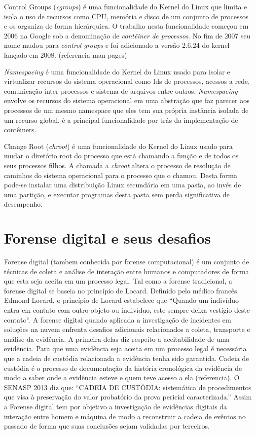 Control Groups (\textit{cgroups}) é uma funcionalidade do Kernel do Linux que limita e isola o uso de recursos como CPU, memória e disco de um conjunto de processos e os organiza de forma hierárquica. 
%
O trabalho nesta funcionalidade começou em 2006 na Google sob a denominação de \textit{contêiner de processos}. No fim de 2007 seu nome mudou para \textit{control groups} e foi adicionado a versão 2.6.24 do kernel lançado em 2008. (referencia man pages)

\textit{Namespacing} é uma funcionalidade do Kernel do Linux usado para isolar e virtualizar recursos do sistema operacional como Ids de processos, acessos a rede, comunicação inter-processos e sistema de arquivos entre outros.
%
\textit{Namespacing} envolve os recursos do sistema operacional em uma abstração que faz parecer aos processos de um mesmo namespace que eles tem sua própria instância isolada de um recurso global, é a principal funcionalidade por trás da implementação de contêiners.

Change Root (\textit{chroot}) é uma funcionalidade do Kernel do Linux usado para mudar o diretório root do processo que está chamando a função e de todos os seus processos filhos. 
%
A chamada a \textit{chroot} altera o processo de resolução de caminhos do sistema operacional para o processo que o chamou.
%
Desta forma pode-se instalar uma distribuição Linux secundária em uma pasta, ao invés de uma partição, e executar programas desta pasta sem perda significativa de desempenho.

\section{Forense digital e seus desafios}
\label{sec:forensedigital}

Forense digital (tambem conhecida por forense computacional) é um conjunto de técnicas de coleta e análise de interação entre humanos e computadores de forma que esta seja aceita em um processo legal.
%
Tal como a forense tradicional, a forense digital se baseia no princípio de Locard. Definido pelo médico francês Edmond Locard, o princípio de Locard estabelece que ``Quando um indivíduo entra em contato com outro objeto ou indivíduo, este sempre deixa vestígio deste contato''. \cite{Ramos:2011}
%
A forense digital quando aplicada a investigação de incidentes em soluções na nuvem enfrenta desafios adicionais relacionados a coleta, transporte e análise da evidência.
%
A primeira delas diz respeito a aceitabilidade de uma evidência. Para que uma evidência seja aceita em um processo legal é necessária que a cadeia de custódia relacionada a evidência tenha sido garantida.
%
Cadeia de custódia é o processo de documentação da história cronológica da evidência de modo a saber onde a evidência esteve e quem teve acesso a ela (referencia). O SENASP 2013 diz que: ``CADEIA DE CUSTÓDIA: sistemática de procedimentos que visa à preservação do valor probatório da prova pericial caracterizada.''
%
Assim a Forense digital tem por objetivo a investigação de evidências digitais da interação entre homem e máquina de modo a reconstruir a cadeia de evêntos no passado de forma que suas conclusões sejam validadas por terceiros.



